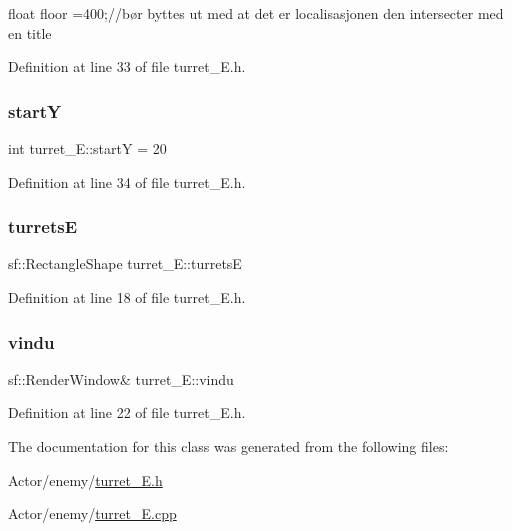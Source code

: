 float floor =400;//bør byttes ut med at det er localisasjonen den intersecter med en title 



Definition at line 33 of file turret\+\_\+\+E.\+h.

\hypertarget{classturret___e_a3236c69dff2e5d1aa3b83f7402b60877}{}\label{classturret___e_a3236c69dff2e5d1aa3b83f7402b60877} 
\subsubsection{\texorpdfstring{startY}{startY}}
{\footnotesize\ttfamily int turret\+\_\+\+E\+::startY = 20}



Definition at line 34 of file turret\+\_\+\+E.\+h.

\hypertarget{classturret___e_a9c1a6a373f875b2d21c0e572a8158832}{}\label{classturret___e_a9c1a6a373f875b2d21c0e572a8158832} 
\subsubsection{\texorpdfstring{turretsE}{turretsE}}
{\footnotesize\ttfamily sf\+::\+Rectangle\+Shape turret\+\_\+\+E\+::turretsE}



Definition at line 18 of file turret\+\_\+\+E.\+h.

\hypertarget{classturret___e_a5c18e0101eee84677c2fade680335276}{}\label{classturret___e_a5c18e0101eee84677c2fade680335276} 
\subsubsection{\texorpdfstring{vindu}{vindu}}
{\footnotesize\ttfamily sf\+::\+Render\+Window\& turret\+\_\+\+E\+::vindu}



Definition at line 22 of file turret\+\_\+\+E.\+h.



The documentation for this class was generated from the following files\+:\begin{DoxyCompactItemize}
\item 
Actor/enemy/\hyperlink{turret___e_8h}{turret\+\_\+\+E.\+h}\item 
Actor/enemy/\hyperlink{turret___e_8cpp}{turret\+\_\+\+E.\+cpp}\end{DoxyCompactItemize}

